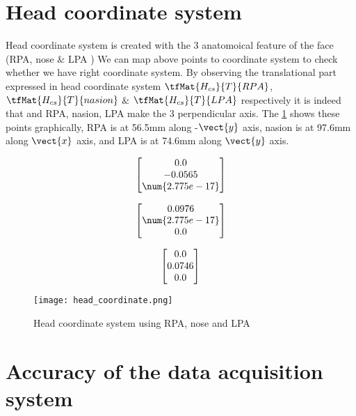 \section{Head coordinate system} Head coordinate system is created with the 3 anatomoical feature of the face (RPA, nose $ \& $ LPA ) We can map above points to coordinate system to check whether we have right coordinate system. By observing the translational part expressed in head coordinate system  $\tfMat{H_{cs}}{T}{RPA}$, $\tfMat{H_{cs}}{T}{nasion}$ $\&$ $\tfMat{H_{cs}}{T}{LPA}$ respectively it is indeed that and RPA, nasion, LPA make the 3 perpendicular axis. The \cref{fig:head_coordinate} shows these points graphically, RPA is at 56.5mm along -$\vect{y}$ axis, nasion is at 97.6mm along $\vect{x}$ axis, and LPA is at 74.6mm along $\vect{y}$ axis. 

\begin{equation*} 
	\centering
	\begin{bmatrix}
		0.0 \\
		-0.0565\\
		\num{2.775e-17}\\
	\end{bmatrix}
\end{equation*}

\begin{equation*} 
	\centering
	\begin{bmatrix}
		0.0976\\
		\num{2.775e-17}\\
		0.0\\
	\end{bmatrix}
\end{equation*}

\begin{equation*} 
	\centering
	\begin{bmatrix}
		0.0\\
		0.0746\\
	    0.0\\
	\end{bmatrix}
\end{equation*}

\begin{figure}[hbt!]
	\centering
	\texttt{[image: head\_coordinate.png]}
	\caption{Head coordinate system using RPA, nose and LPA} 
	\label{fig:head_coordinate}
\end{figure}

\section{Accuracy of the data acquisition system}

